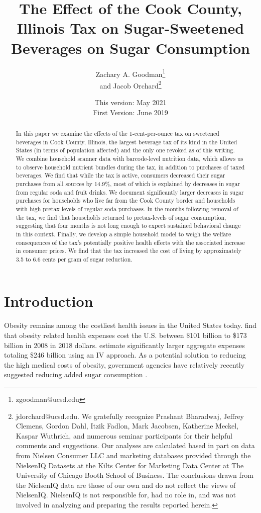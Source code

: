 \documentclass[12pt]{article}
\title{The Effect of the Cook County, Illinois Tax on Sugar-Sweetened Beverages on Sugar Consumption}
\author{Zachary A. Goodman\thanks{zgoodman@ucsd.edu}\\ and Jacob Orchard\thanks{jdorchard@ucsd.edu. We gratefully recognize Prashant Bharadwaj, Jeffrey Clemens, Gordon Dahl, Itzik Fadlon, Mark Jacobsen, Katherine Meckel, Kaspar Wuthrich, and numerous seminar participants for their helpful comments and suggestions. Our analyses are calculated based in part on data from Nielsen Consumer LLC and marketing databases provided through the NielsenIQ Datasets at the Kilts Center for Marketing Data Center at The University of Chicago Booth School of Business. The conclusions drawn from the NielsenIQ data are those of our own and do not reflect the views of NielsenIQ. NielsenIQ is not responsible for, had no role in, and was not involved in analyzing and preparing the results reported herein.}}
\affil{University of California, San Diego}
\date{This version: May 2021\\
First Version: June 2019}
\begin{document}
\maketitle

\begin{abstract}
In this paper we examine the effects of the 1-cent-per-ounce tax on sweetened beverages in Cook County, Illinois, the largest beverage tax of its kind in the United States (in terms of population affected) and the only one revoked as of this writing. We combine household scanner data with barcode-level nutrition data, which allows us to observe household nutrient bundles during the tax, in addition to purchases of taxed beverages. We find that while the tax is active, consumers decreased their sugar purchases from all sources by 14.9\%, most of which is explained by decreases in sugar from regular soda and fruit drinks. We document significantly larger decreases in sugar purchases for households who live far from the Cook County border and households with high pretax levels of regular soda purchases. In the months following removal of the tax, we find that households returned to pretax-levels of sugar consumption, suggesting that four months is not long enough to expect sustained behavioral change in this context. Finally, we develop a simple household model to weigh the welfare consequences of the tax's potentially positive health effects with the associated increase in consumer prices. We find that the tax increased the cost of living by approximately 3.5 to 6.6 cents per gram of sugar reduction.
\end{abstract}

\pagebreak

\doublespacing

\section{Introduction} \label{introduction}

Obesity remains among the costliest health issues in the United States today. \textcite{finkelstein2009annual} find that obesity related health expenses cost the U.S. between \$101 billion to \$173 billion in 2008 in 2018 dollars. \textcite{cawley2012medical} estimate significantly larger aggregate expenses totaling \$246 billion using an IV approach. As a potential solution to reducing the high medical costs of obesity, government agencies have relatively recently suggested reducing added sugar consumption \parencite{dietary2015dietary}.
\end{document}

